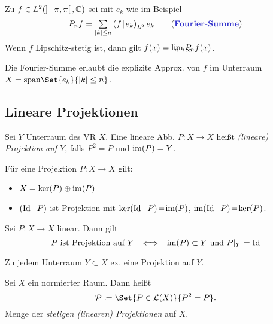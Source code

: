 \documentclass{cheat-sheet}
\newcommand{\LSO}{\mathcal{L}} %
\newcommand{\scp}[2]{\left( #1 \!\mid\! #2 \right)} %
\begin{document}
\begin{lem}
  Zu $f \in L^2(\left] -\pi, \pi \right[, \mathbb{C})$ sei mit $e_k$ wie im Beispiel
  \[ P_n f = \sum_{\abs{k} \leq n} \scp{f}{e_k}_{L^2} e_k \tag*{(\emph{Fourier-Summe})} \]
  Wenn $f$ Lipschitz-stetig ist, dann gilt $f(x) = \lim_{\mathclap{n \to \infty}} P_n f(x)$.
\end{lem}

\begin{samepage}

\begin{bem}
  Die Fourier-Summe erlaubt die explizite Approx. von $f$ im Unterraum $X = \mathrm{span} \Set{e_k}{ \abs{k} \leq n }$.
\end{bem}


\subsection{Lineare Projektionen}

\end{samepage}

\begin{defn}
  Sei $Y$ Unterraum des VR $X$. Eine lineare Abb. $P : X \to X$ heißt \emph{(lineare) Projektion auf $Y$}, falls $P^2 = P$ und $\mathop{\mathrm{im}}(P) = Y$.
\end{defn}

\begin{lem}
  Für eine Projektion $P : X \to X$ gilt:
  \begin{itemize}
    \item $X = \ker(P) \oplus \mathop{\mathrm{im}}(P)$
    \item $(\mathrm{Id} {-} P)$ ist Projektion mit $\ker(\mathrm{Id} {-} P) \!=\! \mathop{\mathrm{im}}(P)$, $\mathop{\mathrm{im}}(\mathrm{Id} {-} P) \!=\! \ker(P)$.
  \end{itemize}
\end{lem}

\begin{lem}
  Sei $P : X \to X$ linear. Dann gilt
  \[
    \text{$P$ ist Projektion auf $Y$}
    \enspace \iff \enspace
    \mathop{\mathrm{im}}(P) \subset Y \text{ und } P|_Y = \mathrm{Id}
  \]
\end{lem}

\begin{bem}
  Zu jedem Unterraum $Y \subset X$ ex. eine Projektion auf $Y$.
\end{bem}

\begin{defn}
  Sei $X$ ein normierter Raum. Dann heißt
  \[ \mathcal{P} \coloneqq \Set{P \in \LSO(X)}{P^2 = P}. \]
  Menge der \emph{stetigen (linearen) Projektionen} auf $X$.
\end{defn}
\end{document}
